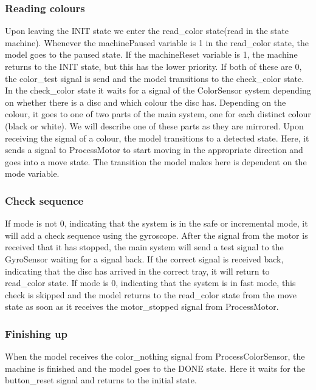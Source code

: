 \documentclass[a4paper,oneside,11pt]{article}
\begin{document}
\subsubsection{Reading colours}
Upon leaving the INIT state we enter the read\_color state(read in the state machine). Whenever the machinePaused variable is 1 in the read\_color state, the model goes to the paused state. If the machineReset variable is 1, the machine returns to the INIT state, but this has the lower priority. If both of these are 0, the color\_test signal is send and the model transitions to the check\_color state.  In the check\_color state it waits for a signal of the ColorSensor system depending on whether there is a disc and which colour the disc has. Depending on the colour, it goes to one of two parts of the main system, one for each distinct colour (black or white). We will describe one of these parts as they are mirrored. Upon receiving the signal of a colour, the model transitions to a detected state. Here, it sends a signal to ProcessMotor to start moving in the appropriate direction and goes into a move state. The transition the model makes here is dependent on the mode variable.

\subsubsection{Check sequence}
If mode is not 0, indicating that the system is in the safe or incremental mode, it will add a check sequence using the gyroscope. After the signal from the motor is received that it has stopped, the main system will send a test signal to the GyroSensor waiting for a signal back. If the correct signal is received back, indicating that the disc has arrived in the correct tray, it will return to read\_color state. If mode is 0, indicating that the system is in fast mode, this check is skipped and the model returns to the read\_color state from the move state as soon as it receives the motor\_stopped signal from ProcessMotor.

\subsubsection{Finishing up}
When the model receives the color\_nothing signal from ProcessColorSensor, the machine is finished and the model goes to the DONE state. Here it waits for the button\_reset signal and returns to the initial state.
\end{document}
